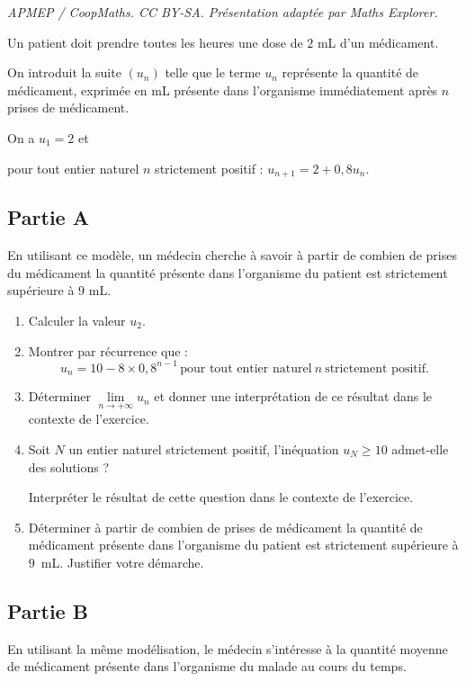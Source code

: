 \documentclass[10pt]{article}
\begin{document}
\noindent\textit{APMEP / CoopMaths. CC BY-SA. Présentation adaptée par Maths Explorer.}\par\medskip
Un patient doit prendre toutes les heures une dose de $2$ mL d'un médicament.

On introduit la suite $\left(u_n\right)$
telle que le terme $u_n$ représente la quantité de médicament, exprimée en mL présente dans l'organisme immédiatement après $n$ prises de médicament.

On a $u_1 = 2$ et 

\begin{center}pour tout entier naturel $n$ strictement positif : $u_{n+1} = 2 + 0,8u_n$.\end{center}

\subsection*{Partie A}

En utilisant ce modèle, un médecin cherche à savoir à partir de combien de prises du médicament la quantité présente dans l'organisme du patient est strictement supérieure à 9 mL.

\begin{enumerate}
\item Calculer la valeur $u_2$.
\item Montrer par récurrence que :
\[u_n = 10 - 8 \times 0{,}8^{n-1} \,\text{pour tout entier naturel} \:n \:\text{strictement
positif.}\]

\item Déterminer $\lim\limits_{n \to +\infty} u_n$ et donner une interprétation de ce résultat dans le contexte de l'exercice.
\item Soit $N$ un entier naturel strictement positif, l'inéquation $u_N \geqslant 10$ admet-elle des solutions ? 

Interpréter le résultat de cette question dans le contexte de l'exercice.
\item Déterminer à partir de combien de prises de médicament la quantité de médicament présente dans l'organisme du patient est strictement supérieure à $9$~mL. Justifier votre démarche.
\end{enumerate}

\subsection*{Partie B}

En utilisant la même modélisation, le médecin s'intéresse à la quantité moyenne de médicament présente dans l'organisme du malade au cours du temps.
\end{document}
